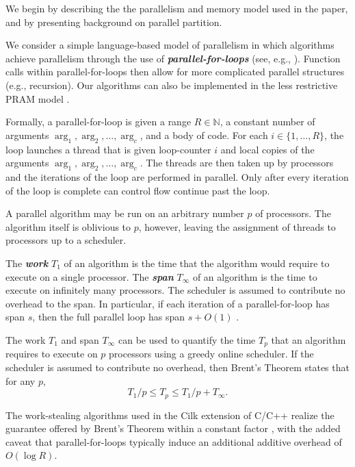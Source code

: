 \documentclass[11pt]{article}
\newcommand{\defn}[1]{{\textit{\textbf{\boldmath #1}}} }
\renewcommand{\paragraph}[1]{\vspace{0.09in}\noindent{\bf \boldmath #1.}}
\theoremstyle{remark}
\theoremstyle{remark}
\begin{document}
We begin by describing the the parallelism and memory model used in the paper,
and by presenting background on parallel partition.

\paragraph{Workflow Model} We consider a simple language-based model of
parallelism in which algorithms achieve parallelism through the use of
\defn{parallel-for-loops} (see, e.g.,
\cite{Blelloch96,AcarBl16,CLRS}).  Function calls within
parallel-for-loops then allow for more complicated parallel structures
(e.g., recursion). Our algorithms can also be implemented in the less
restrictive PRAM model \cite{Blelloch96, AcarBl16}.

Formally, a parallel-for-loop is given a range $R \in \mathbb{N}$, a constant
number of arguments $\arg_1, \arg_2, \ldots, \arg_c$, and a body of code. For
each $i \in \{1, \ldots, R\}$, the loop launches a thread that is given
loop-counter $i$ and local copies of the arguments $\arg_1, \arg_2, \ldots,
\arg_c$. The threads are then taken up by processors and the iterations of the
loop are performed in parallel. Only after every iteration of the loop is
complete can control flow continue past the loop.

A parallel algorithm may be run on an arbitrary number $p$ of
processors. The algorithm itself is oblivious to $p$, however, leaving
the assignment of threads to processors up to a scheduler.

The \defn{work} $T_1$ of an algorithm is the time that the algorithm
would require to execute on a single processor. The \defn{span}
$T_\infty$ of an algorithm is the time to execute on infinitely many
processors. The scheduler is assumed to contribute no overhead to the
span. In particular, if each iteration of a
parallel-for-loop has span $s$, then the full parallel loop has span
$s + O(1)$ \cite{Blelloch96,AcarBl16}.

The work $T_1$ and span $T_\infty$ can be used to quantify the time $T_p$
that an algorithm requires to execute on $p$ processors using a greedy
online scheduler. If the scheduler is assumed to contribute no
overhead, then Brent's Theorem \cite{Brent74} states that for any
$p$,
$$T_1 / p \le T_p \le T_1 / p + T_\infty.$$

The work-stealing algorithms used in the Cilk extension of C/C++ realize
the guarantee offered by Brent's Theorem within a constant factor
\cite{BlumofeJo96,BlumofeLe99}, with the added caveat that parallel-for-loops
typically induce an additional additive overhead of $O(\log R)$. 
\end{document}
